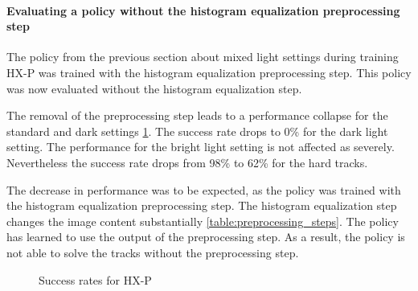 \paragraph{Evaluating a policy without the histogram equalization preprocessing step}

The policy from the previous section about mixed light settings during training \ac{HX-P} was trained with the histogram equalization preprocessing step. This policy was now evaluated without the histogram equalization step. 

The removal of the preprocessing step leads to a performance collapse for the standard and dark settings \ref{fig:hardDistance_mixedLight_comparison_withWithoutHistogramEqualization}. The success rate drops to 0\% for the dark light setting.
The performance for the bright light setting is not affected as severely. Nevertheless the success rate drops from 98\% to 62\% for the hard tracks.

The decrease in performance was to be expected, as the policy was trained with the histogram equalization preprocessing step. The histogram equalization step changes the image content substantially \ref{table:preprocessing_steps}. The policy has learned to use the output of the preprocessing step. As a result, the policy is not able to solve the tracks without the preprocessing step.

\begin{figure}
    \centering
    \caption{Success rates for \ac{HX-P}}
    \label{fig:hardDistance_mixedLight_comparison_withWithoutHistogramEqualization}
\end{figure}


